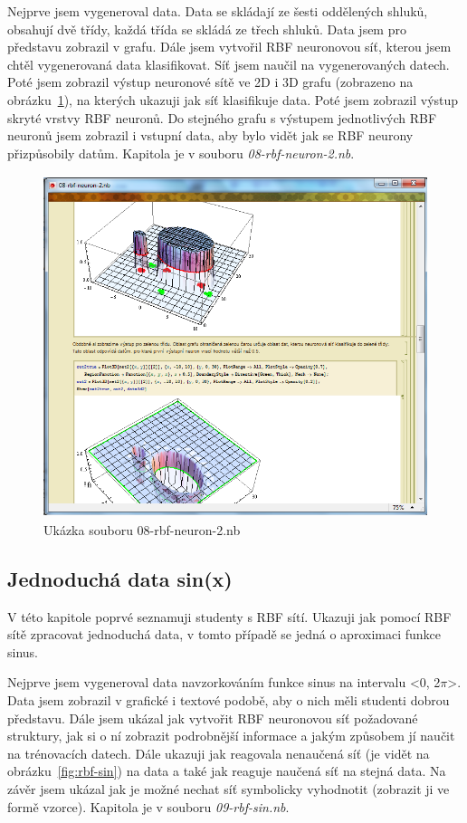 \documentclass[11pt,twoside,a4paper]{book}
\begin{document}
Nejprve jsem vygeneroval data. Data se skládají ze šesti oddělených shluků, obsahují dvě třídy, každá třída se skládá ze třech shluků. Data jsem pro představu zobrazil v grafu. Dále jsem vytvořil RBF neuronovou síť, kterou jsem chtěl vygenerovaná data klasifikovat. Síť jsem naučil na vygenerovaných datech. Poté jsem zobrazil výstup neuronové sítě ve 2D i 3D grafu (zobrazeno na obrázku~\ref{fig:rbf-neuron2}), na kterých ukazuji jak síť klasifikuje data. Poté jsem zobrazil výstup skryté vrstvy RBF neuronů. Do stejného grafu s výstupem jednotlivých RBF neuronů jsem zobrazil i vstupní data, aby bylo vidět jak se RBF neurony přizpůsobily datům. Kapitola je v souboru \textit{08-rbf-neuron-2.nb}.

\begin{figure}[h!]
\begin{center}
\includegraphics[height=10cm]{figures/ukazka08.png}
\caption{Ukázka souboru 08-rbf-neuron-2.nb}
\label{fig:rbf-neuron2}
\end{center}
\end{figure}

\subsection{Jednoduchá data sin(x)}
V této kapitole poprvé seznamuji studenty s RBF sítí. Ukazuji jak pomocí RBF sítě zpracovat jednoduchá data, v tomto případě se jedná o aproximaci funkce sinus.

Nejprve jsem vygeneroval data navzorkováním funkce sinus na intervalu <0, 2\begin{math}\pi \end{math}>. Data jsem zobrazil v grafické i textové podobě, aby o nich měli studenti dobrou představu. Dále jsem ukázal jak vytvořit RBF neuronovou síť požadované struktury, jak si o ní zobrazit podrobnější informace a jakým způsobem jí naučit na trénovacích datech. Dále ukazuji jak reagovala nenaučená síť (je vidět na obrázku~\ref{fig:rbf-sin}) na data a také jak reaguje naučená síť na stejná data. Na závěr jsem ukázal jak je možné nechat síť symbolicky vyhodnotit (zobrazit ji ve formě vzorce). Kapitola je v souboru \textit{09-rbf-sin.nb}.
\end{document}

